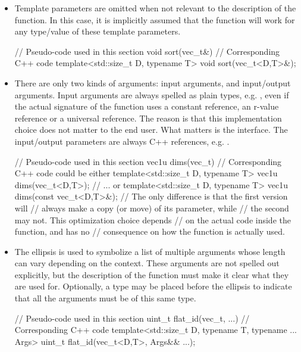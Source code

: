 \documentclass[12pt]{report}
\newenvironment{example}
{
    \begin{mdframed}[style=example,frametitle={Example}]
}
{
    \end{mdframed}
}
\begin{document}
\begin{itemize}
\item Template parameters are omitted when not relevant to the description of the function. In this case, it is implicitly assumed that the function will work for any type/value of these template parameters.

\begin{example}
\begin{cppcode}
// Pseudo-code used in this section
void sort(vec_t&)
// Corresponding C++ code
template<std::size_t D, typename T>
void sort(vec_t<D,T>&);
\end{cppcode}
\end{example}

\item There are only two kinds of arguments: input arguments, and input/output arguments. Input arguments are always spelled as plain types, e.g. , even if the actual signature of the function uses a constant reference, an r-value reference or a universal reference. The reason is that this implementation choice does not matter to the end user. What matters is the interface. The input/output parameters are always C++ references, e.g. .

\begin{example}
\begin{cppcode}
// Pseudo-code used in this section
vec1u dims(vec_t)
// Corresponding C++ code could be either
template<std::size_t D, typename T>
vec1u dims(vec_t<D,T>);
// ... or
template<std::size_t D, typename T>
vec1u dims(const vec_t<D,T>&);
// The only difference is that the first version will
// always make a copy (or move) of its parameter, while
// the second may not. This optimization choice depends
// on the actual code inside the function, and has no
// consequence on how the function is actually used.
\end{cppcode}
\end{example}

\item The ellipsis  is used to symbolize a list of multiple arguments whose length can vary depending on the context. These arguments are not spelled out explicitly, but the description of the function must make it clear what they are used for. Optionally, a type may be placed before the ellipsis to indicate that all the arguments must be of this same type.

\begin{example}
\begin{cppcode}
// Pseudo-code used in this section
uint_t flat_id(vec_t, ...)
// Corresponding C++ code
template<std::size_t D, typename T, typename ... Args>
uint_t flat_id(vec_t<D,T>, Args&& ...);
\end{cppcode}
\end{example}


\end{itemize}
\end{document}
